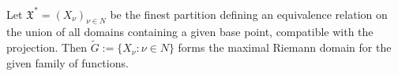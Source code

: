 Let $\mathfrak{X}^* = (X_\nu)_{\nu \in N}$ be the finest partition defining an equivalence relation on the union of all domains containing a given base point, compatible with the projection. Then $\tilde{G} := \{X_\nu : \nu \in N\}$ forms the maximal Riemann domain for the given family of functions.
